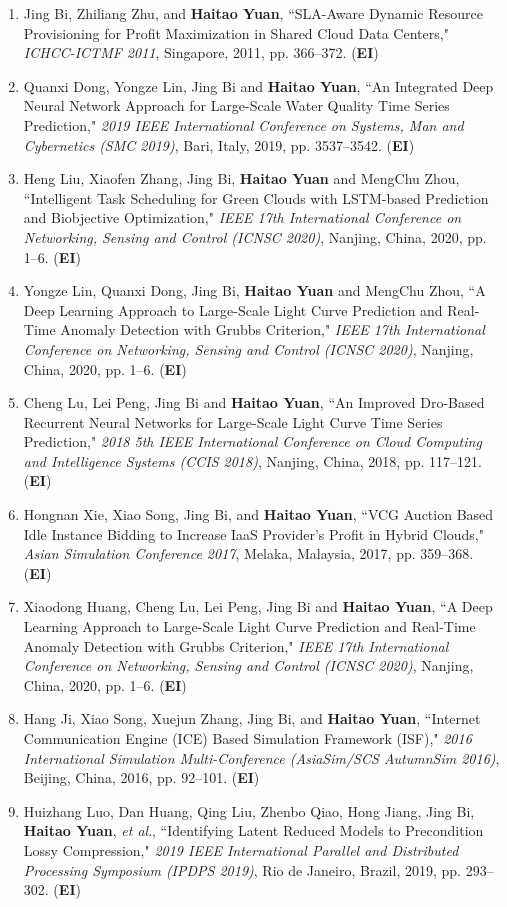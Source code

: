 \documentclass[margin,line]{res}
\begin{document}
\begin{resume}
\begin{enumerate}
\item Jing Bi, Zhiliang Zhu, and \textbf{Haitao Yuan}, ``SLA-Aware Dynamic Resource Provisioning for Profit Maximization in Shared Cloud Data Centers," \emph{ICHCC-ICTMF 2011}, Singapore, 2011, pp. 366--372. (\textbf{EI})
\item Quanxi Dong, Yongze Lin, Jing Bi and \textbf{Haitao Yuan}, ``An Integrated Deep Neural Network Approach for Large-Scale Water Quality Time Series Prediction," \emph{2019 IEEE International Conference on Systems, Man and Cybernetics (SMC 2019)}, Bari, Italy, 2019, pp. 3537--3542. (\textbf{EI})
\item Heng Liu, Xiaofen Zhang, Jing Bi, \textbf{Haitao Yuan} and MengChu Zhou, ``Intelligent Task Scheduling for Green Clouds with LSTM-based Prediction and Biobjective Optimization," \emph{IEEE 17th International Conference on Networking, Sensing and Control (ICNSC 2020)}, Nanjing, China, 2020, pp. 1--6. (\textbf{EI})
\item Yongze Lin, Quanxi Dong, Jing Bi, \textbf{Haitao Yuan} and MengChu Zhou, ``A Deep Learning Approach to Large-Scale Light Curve Prediction and Real-Time Anomaly Detection with Grubbs Criterion," \emph{IEEE 17th International Conference on Networking, Sensing and Control (ICNSC 2020)}, Nanjing, China, 2020, pp. 1--6. (\textbf{EI})
\item Cheng Lu, Lei Peng, Jing Bi and \textbf{Haitao Yuan}, ``An Improved Dro-Based Recurrent Neural Networks for Large-Scale Light Curve Time Series Prediction," \emph{2018 5th IEEE International Conference on Cloud Computing and Intelligence Systems (CCIS 2018)}, Nanjing, China, 2018, pp. 117--121. (\textbf{EI})
\item Hongnan Xie, Xiao Song, Jing Bi, and \textbf{Haitao Yuan}, ``VCG Auction Based Idle Instance Bidding to Increase IaaS Provider’s Profit in Hybrid Clouds," \emph{Asian Simulation Conference 2017}, Melaka, Malaysia, 2017, pp. 359--368. (\textbf{EI})
\item Xiaodong Huang, Cheng Lu, Lei Peng, Jing Bi and \textbf{Haitao Yuan}, ``A Deep Learning Approach to Large-Scale Light Curve Prediction and Real-Time Anomaly Detection with Grubbs Criterion," \emph{IEEE 17th International Conference on Networking, Sensing and Control (ICNSC 2020)}, Nanjing, China, 2020, pp. 1--6. (\textbf{EI})
\item Hang Ji, Xiao Song, Xuejun Zhang, Jing Bi, and \textbf{Haitao Yuan}, ``Internet Communication Engine (ICE) Based Simulation Framework (ISF)," \emph{2016 International Simulation Multi-Conference (AsiaSim/SCS AutumnSim 2016)}, Beijing, China, 2016, pp. 92--101. (\textbf{EI})
\item Huizhang Luo, Dan Huang, Qing Liu, Zhenbo Qiao, Hong Jiang, Jing Bi, \textbf{Haitao Yuan}, \textit{et al}., ``Identifying Latent Reduced Models to Precondition Lossy Compression," \emph{2019 IEEE International Parallel and Distributed Processing Symposium (IPDPS 2019)}, Rio de Janeiro, Brazil, 2019, pp. 293--302. (\textbf{EI})
\end{enumerate}


\end{resume}
\end{document}
